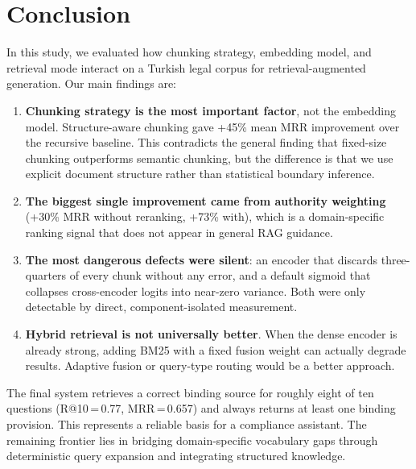 \documentclass[11pt,a4paper,twocolumn]{article}
\begin{document}
\section{Conclusion}
\label{sec:conclusion}

In this study, we evaluated how chunking strategy, embedding model, and retrieval mode interact on a Turkish legal corpus for retrieval-augmented generation. Our main findings are:

\begin{enumerate}[leftmargin=*]
  \item \textbf{Chunking strategy is the most important factor}, not the embedding model. Structure-aware chunking gave +45\% mean MRR improvement over the recursive baseline. This contradicts the general finding that fixed-size chunking outperforms semantic chunking, but the difference is that we use explicit document structure rather than statistical boundary inference.

  \item \textbf{The biggest single improvement came from authority weighting} (+30\% MRR without reranking, +73\% with), which is a domain-specific ranking signal that does not appear in general RAG guidance.

  \item \textbf{The most dangerous defects were silent}: an encoder that discards three-quarters of every chunk without any error, and a default sigmoid that collapses cross-encoder logits into near-zero variance. Both were only detectable by direct, component-isolated measurement.

  \item \textbf{Hybrid retrieval is not universally better}. When the dense encoder is already strong, adding BM25 with a fixed fusion weight can actually degrade results. Adaptive fusion or query-type routing would be a better approach.
\end{enumerate}

The final system retrieves a correct binding source for roughly eight of ten questions (R@10\,=\,0.77, MRR\,=\,0.657) and always returns at least one binding provision. This represents a reliable basis for a compliance assistant. The remaining frontier lies in bridging domain-specific vocabulary gaps through deterministic query expansion and integrating structured knowledge.



\end{document}

